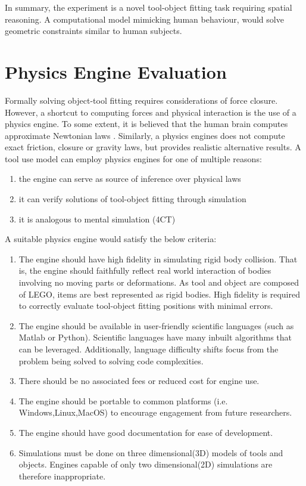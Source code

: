 \documentclass[11]{article}
\begin{document}
In summary, the experiment is a novel tool-object fitting task requiring spatial reasoning.
A computational model mimicking human behaviour, would solve geometric constraints similar to human subjects.

\section{Physics Engine Evaluation}

Formally solving object-tool fitting requires considerations of force closure.
However, a shortcut to computing forces and physical interaction is the use of a physics engine. 
To some extent, it is believed that the human brain computes approximate Newtonian laws \cite{battaglia2013}. 
Similarly, a physics engines does not compute exact friction, closure or gravity laws, but provides realistic alternative results. 
A tool use model can employ physics engines for one of multiple reasons:
\begin{enumerate}
      \item the engine can serve as source of inference over physical laws   
      \item it can verify solutions of tool-object fitting through simulation
      \item it is analogous to mental simulation (4CT)
\end{enumerate}

A suitable physics engine would satisfy the below criteria:
\begin{enumerate}
    \item The engine should have high fidelity in simulating rigid body collision. 
      That is, the engine should faithfully reflect real world interaction of bodies involving no moving parts or deformations.
      As tool and object are composed of LEGO, items are best represented as rigid bodies.   
      High fidelity is required to correctly evaluate tool-object fitting positions with minimal errors.
    \item The engine should be available in user-friendly scientific languages (such as Matlab or Python). 
      Scientific languages have many inbuilt algorithms that can be leveraged.
      Additionally, language difficulty shifts focus from the problem being solved to solving code complexities.
    \item There should be no associated fees or reduced cost for engine use.
    \item The engine should be portable to common platforms (i.e. Windows,Linux,MacOS) to encourage engagement from future researchers.
    \item The engine should have good documentation for ease of development.
    \item Simulations must be done on three dimensional(3D) models of tools and objects.
      Engines capable of only two dimensional(2D) simulations are therefore inappropriate.  
\end{enumerate}
\end{document}
